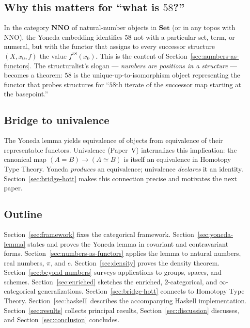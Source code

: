 \documentclass[12pt]{article}
\theoremstyle{definition}
\theoremstyle{remark}
\begin{document}
\subsection{Why this matters for ``what is \texorpdfstring{$58$}{58}?''}

In the category $\mathbf{NNO}$ of natural-number objects in $\mathbf{Set}$ (or in any topos with NNO), the Yoneda embedding identifies $58$ not with a particular set, term, or numeral, but with the functor that assigns to every successor structure $(X, x_0, f)$ the value $f^{58}(x_0)$. This is the content of Section~\ref{sec:numbers-as-functors}. The structuralist's slogan --- \emph{numbers are positions in a structure} --- becomes a theorem: $58$ is the unique-up-to-isomorphism object representing the functor that probes structures for ``$58$th iterate of the successor map starting at the basepoint.''

\subsection{Bridge to univalence}

The Yoneda lemma yields equivalence of objects from equivalence of their representable functors. Univalence (Paper~V) internalizes this implication: the canonical map $(A = B) \to (A \simeq B)$ is itself an equivalence in Homotopy Type Theory. Yoneda \emph{produces} an equivalence; univalence \emph{declares} it an identity. Section~\ref{sec:bridge-hott} makes this connection precise and motivates the next paper.

\subsection{Outline}

Section~\ref{sec:framework} fixes the categorical framework. Section~\ref{sec:yoneda-lemma} states and proves the Yoneda lemma in covariant and contravariant forms. Section~\ref{sec:numbers-as-functors} applies the lemma to natural numbers, real numbers, $\pi$, and $e$. Section~\ref{sec:density} proves the density theorem. Section~\ref{sec:beyond-numbers} surveys applications to groups, spaces, and schemes. Section~\ref{sec:enriched} sketches the enriched, $2$-categorical, and $\infty$-categorical generalizations. Section~\ref{sec:bridge-hott} connects to Homotopy Type Theory. Section~\ref{sec:haskell} describes the accompanying Haskell implementation. Section~\ref{sec:results} collects principal results, Section~\ref{sec:discussion} discusses, and Section~\ref{sec:conclusion} concludes.
\end{document}
